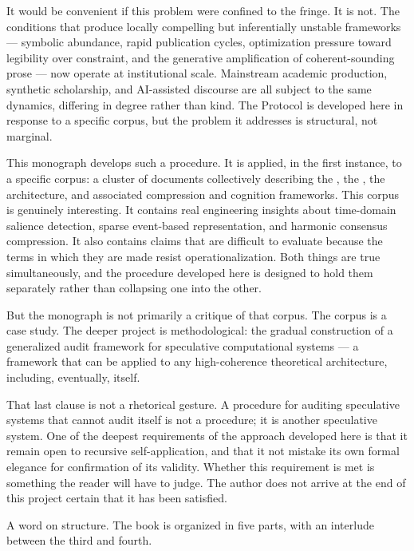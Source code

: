 It would be convenient if this problem were confined to the fringe.
It is not. The conditions that produce locally compelling but
inferentially unstable frameworks --- symbolic abundance, rapid
publication cycles, optimization pressure toward legibility over
constraint, and the generative amplification of coherent-sounding
prose --- now operate at institutional scale. Mainstream academic
production, synthetic scholarship, and AI-assisted discourse are all
subject to the same dynamics, differing in degree rather than kind.
The \Ortyx{} Protocol is developed here in response to a specific
corpus, but the problem it addresses is structural, not marginal.

\medskip

This monograph develops such a procedure. It is applied, in the first
instance, to a specific corpus: a cluster of documents collectively
describing the \Phoenix{}, the \Marine{}, the \MEMeight{} architecture,
and associated compression and cognition frameworks. This corpus is
genuinely interesting. It contains real engineering insights about
time-domain salience detection, sparse event-based representation, and
harmonic consensus compression. It also contains claims that are
difficult to evaluate because the terms in which they are made resist
operationalization. Both things are true simultaneously, and the
procedure developed here is designed to hold them separately rather
than collapsing one into the other.

But the monograph is not primarily a critique of that corpus. The
corpus is a case study. The deeper project is methodological: the
gradual construction of a generalized audit framework for speculative
computational systems --- a framework that can be applied to any
high-coherence theoretical architecture, including, eventually, itself.

That last clause is not a rhetorical gesture. A procedure for auditing
speculative systems that cannot audit itself is not a procedure; it is
another speculative system. One of the deepest requirements of the
approach developed here is that it remain open to recursive
self-application, and that it not mistake its own formal elegance for
confirmation of its validity. Whether this requirement is met is
something the reader will have to judge. The author does not arrive at
the end of this project certain that it has been satisfied.

\medskip

A word on structure. The book is organized in five parts, with an
interlude between the third and fourth.

